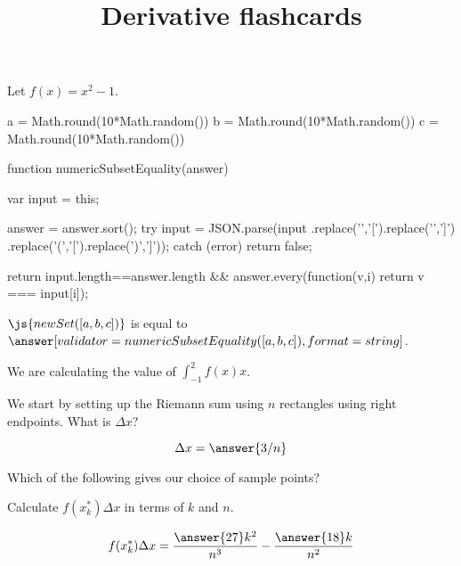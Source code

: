 \documentclass{ximera}
\title{Derivative flashcards}
\begin{document}
\begin{exercise}
Let $f(x) = x^2-1$.

\begin{javascript}
  a = Math.round(10*Math.random())
  b = Math.round(10*Math.random())
  c = Math.round(10*Math.random())  

  function numericSubsetEquality(answer) {
    var input = this;

    answer = answer.sort();
    try {
      input = JSON.parse(input
        .replace('{','[').replace('}',']')
        .replace('(','[').replace(')',']'));
    } catch (error) {
      return false;
    }
    
     return input.length==answer.length &&
       answer.every(function(v,i) { return v === input[i]});
  }
\end{javascript}

\begin{problem}
  $\js{new Set([a,b,c])}$ is equal to $\answer[validator=numericSubsetEquality([a,b,c]),format=string]{}$.
\end{problem}

We are calculating the value of $\displaystyle \int_{-1}^{2} f(x)  x$.
 

We start by setting up the Riemann sum using $n$ rectangles using right endpoints.
What is $\Delta x$?
     
\[ \Delta x = \answer{3/n} \]

\begin{exercise}
  Which of the following gives our choice of sample points?
  \begin{multipleChoice}
  \end{multipleChoice}
  
  \begin{exercise}
    Calculate $f(x_k^*) \Delta x$ in terms of $k$ and $n$.
    
    \[ f(x_k^*) \Delta x = \frac{\answer{27}k^2}{n^3}-\frac{\answer{18}k}{n^2} \]
  \end{exercise}
\end{exercise}
\end{exercise}
\end{document}
